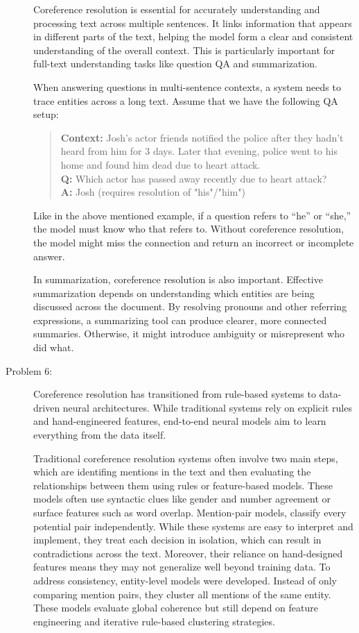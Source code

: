 \documentclass[10pt]{article}
\begin{document}
\begin{description}
Coreference resolution is essential for accurately understanding and processing text across multiple sentences. 
It links information that appears in different parts of the text, helping the model form a clear and consistent understanding of the overall context.
This is particularly important for full-text understanding tasks like question QA and summarization.

When answering questions in multi-sentence contexts, a system needs to trace entities across a long text.
Assume that we have the following QA setup:

\begin{quote}
    \textbf{Context:} Josh's actor friends notified the police after they hadn't heard from him for 3 days.
    Later that evening, police went to his home and found him dead due to heart attack. \\
    \textbf{Q:} Which actor has passed away recently due to heart attack? \\
    \textbf{A:} Josh (requires resolution of "his"/"him") \\
\end{quote}

Like in the above mentioned example, if a question refers to “he” or “she,” the model must know who that refers to. 
Without coreference resolution, the model might miss the connection and return an incorrect or incomplete answer.

In summarization, coreference resolution is also important. 
Effective summarization depends on understanding which entities are being discussed across the document. 
By resolving pronouns and other referring expressions, a summarizing tool can produce clearer, more connected summaries. 
Otherwise, it might introduce ambiguity or misrepresent who did what.

\item[Problem 6:] \hfill %

Coreference resolution has transitioned from rule-based systems to data-driven neural architectures. 
While traditional systems rely on explicit rules and hand-engineered features, end-to-end neural models aim to learn everything from the data itself.

Traditional coreference resolution systems often involve two main steps, which are identifing mentions in the text and then evaluating
the relationships between them using rules or feature-based models.
These models often use syntactic clues like gender and number agreement or surface features such as word overlap. 
Mention-pair models, classify every potential pair independently. While these systems are easy to interpret and implement,
they treat each decision in isolation, which can result in contradictions across the text. Moreover, their reliance on hand-designed 
features means they may not generalize well beyond training data. 
To address consistency, entity-level models were developed. Instead of only comparing mention pairs, they cluster all mentions of the same entity. 
These models evaluate global coherence but still depend on feature engineering and iterative rule-based clustering strategies.


\end{description}
\end{document}
